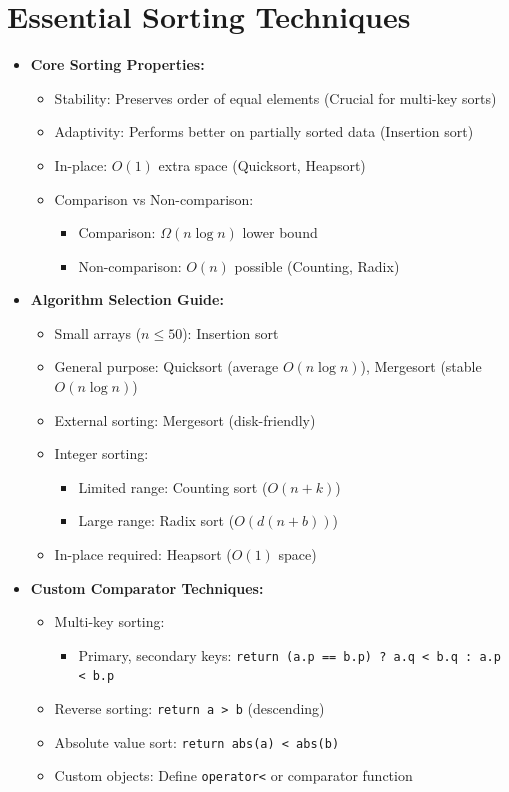 \documentclass[a4paper,10pt]{book}
\begin{document}
\chapter{Essential Sorting Techniques }
\label{sec:sorting}
\begin{itemize}
    \item \textbf{Core Sorting Properties:}
    \begin{itemize}
        \item Stability: Preserves order of equal elements (Crucial for multi-key sorts)
        \item Adaptivity: Performs better on partially sorted data (Insertion sort)
        \item In-place: $O(1)$ extra space (Quicksort, Heapsort)
        \item Comparison vs Non-comparison: 
        \begin{itemize}
            \item Comparison: $\Omega(n \log n)$ lower bound
            \item Non-comparison: $O(n)$ possible (Counting, Radix)
        \end{itemize}
    \end{itemize}
    
    \item \textbf{Algorithm Selection Guide:}
    \begin{itemize}
        \item Small arrays ($n \leq 50$): Insertion sort
        \item General purpose: Quicksort (average $O(n \log n)$), Mergesort (stable $O(n \log n)$)
        \item External sorting: Mergesort (disk-friendly)
        \item Integer sorting: 
        \begin{itemize}
            \item Limited range: Counting sort ($O(n + k)$)
            \item Large range: Radix sort ($O(d(n + b))$)
        \end{itemize}
        \item In-place required: Heapsort ($O(1)$ space)
    \end{itemize}
    
    \item \textbf{Custom Comparator Techniques:}
    \begin{itemize}
        \item Multi-key sorting:
        \begin{itemize}
            \item Primary, secondary keys: \texttt{return (a.p == b.p) ? a.q < b.q : a.p < b.p}
        \end{itemize}
        \item Reverse sorting: \texttt{return a > b} (descending)
        \item Absolute value sort: \texttt{return abs(a) < abs(b)}
        \item Custom objects: Define \texttt{operator<} or comparator function
    \end{itemize}
    

\end{itemize}
\end{document}
